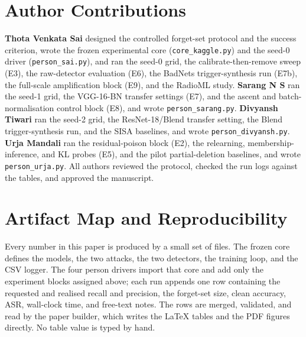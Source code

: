 \section*{Author Contributions}
\label{sec:contrib}

\textbf{Thota Venkata Sai} designed the controlled forget-set protocol and the
success criterion, wrote the frozen experimental core (\texttt{core\_kaggle.py})
and the seed-0 driver (\texttt{person\_sai.py}), and ran the seed-0 grid, the
calibrate-then-remove sweep (E3), the raw-detector evaluation (E6), the BadNets
trigger-synthesis run (E7b), the full-scale amplification block (E9), and the
RadioML study. \textbf{Sarang N S} ran the seed-1 grid, the VGG-16-BN transfer
settings (E7), and the ascent and batch-normalisation control block (E8), and
wrote \texttt{person\_sarang.py}. \textbf{Divyansh Tiwari} ran the seed-2 grid,
the ResNet-18/Blend transfer setting, the Blend trigger-synthesis run, and the
SISA baselines, and wrote \texttt{person\_divyansh.py}. \textbf{Urja Mandali} ran
the residual-poison block (E2), the relearning, membership-inference, and KL
probes (E5), and the pilot partial-deletion baselines, and wrote
\texttt{person\_urja.py}. All authors reviewed the protocol, checked the run logs
against the tables, and approved the manuscript.

\section*{Artifact Map and Reproducibility}
\label{sec:artifact}

Every number in this paper is produced by a small set of files. The frozen core
defines the models, the two attacks, the two detectors, the training loop, and the
CSV logger. The four person drivers import that core and add only the experiment
blocks assigned above; each run appends one row containing the requested and
realised recall and precision, the forget-set size, clean accuracy, ASR,
wall-clock time, and free-text notes. The rows are merged, validated, and read by
the paper builder, which writes the \LaTeX{} tables and the PDF figures directly.
No table value is typed by hand.

